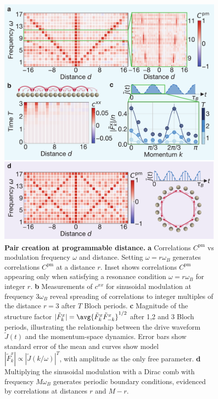 \documentclass[aps,pra,superscriptaddress,12pt]{revtex4-1} %
\begin{document}
\begin{bibunit}
\begin{figure}[p]
\includegraphics[height=5in]{Figures/Figure2.pdf}
\caption{\textbf{Pair creation at programmable distance.}  \textbf{a} Correlations $C^{\mathrm{pm}}$ vs modulation frequency $\omega$ and distance. Setting $\omega = r\omega_B$ generates correlations $C^\text{pm}$ at a distance
$r$.  Inset shows correlations $C^\text{pm}$ appearing only when satisfying a
resonance condition $\omega = r\omega_B$ for integer $r$.  \textbf{b} Measurements of $c^{xx}$ for sinusoidal modulation at frequency $3\omega_B$ reveal spreading of correlations to integer multiples of the distance $r=3$ after $T$ Bloch periods.
\textbf{c} Magnitude of the structure factor $|\tilde{F}_k^x| = \avg{\tilde{F}^x_{k}\tilde{F}^x_{-k}}^{1/2}$ after 1,2 and 3 Bloch periods, illustrating the relationship between the drive waveform $\tilde{J}(t)$ and the momentum-space dynamics. Error bars show standard error of the mean and curves show model $|\tilde{F}^x_k| \propto |\tilde{J}(k/\omega)|^T$, with amplitude as the only free parameter.
\textbf{d} Multiplying the sinusoidal modulation with a Dirac comb with frequency $M\omega_B$
generates periodic boundary conditions, evidenced by correlations at distances $r$ and $M-r$.}
\label{fig:sideband_frequency}
\end{figure}


\end{bibunit}
\end{document}
